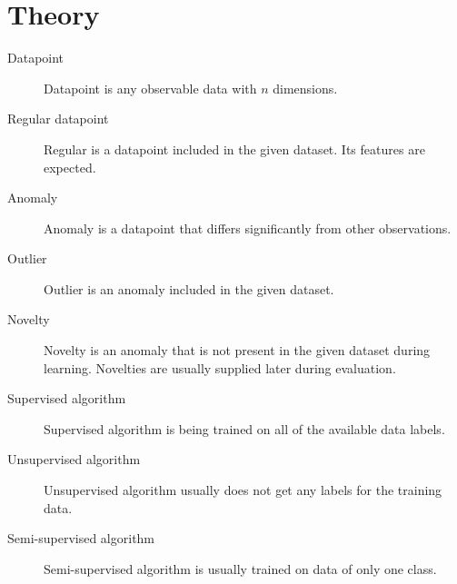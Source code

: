 
\section{Theory}
\label{sec:theory}

\begin{description}
    \item[Datapoint] Datapoint is any observable data with \(n\) dimensions.
    \item[Regular datapoint] Regular is a datapoint included in the given dataset. Its features are expected.
    \item[Anomaly] Anomaly is a datapoint that differs significantly from other observations.
    \item[Outlier] Outlier is an anomaly included in the given dataset.
    \item[Novelty] Novelty is an anomaly that is not present in the given dataset during
learning. Novelties are usually supplied later during evaluation.
    \item[Supervised algorithm] Supervised algorithm is being trained on all of the available data labels.
    \item[Unsupervised algorithm] Unsupervised algorithm usually does not get any labels for the training data.
    \item[Semi-supervised algorithm] Semi-supervised algorithm is usually trained on data of only one class.
\end{description}